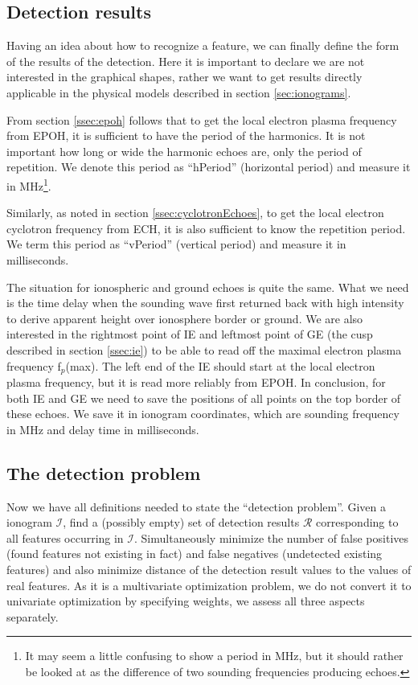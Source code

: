 \subsection{Detection results}
Having an idea about how to recognize a feature, we can finally define the form of the results of the detection. Here it is important to declare we are not interested in the graphical shapes, rather we want to get results directly applicable in the physical models described in section \ref{sec:ionograms}. 

From section \ref{ssec:epoh} follows that to get the local electron plasma frequency from EPOH, it is sufficient to have the period of the harmonics. It is not important how long or wide the harmonic echoes are, only the period of repetition. We  denote this period as ``hPeriod'' (horizontal period) and measure it in MHz\footnote{It may seem a little confusing to show a period in MHz, but it should rather be looked at as the difference of two sounding frequencies producing echoes.}.

Similarly, as noted in section \ref{ssec:cyclotronEchoes}, to get the local electron cyclotron frequency from ECH, it is also sufficient to know the repetition period. We term this period as ``vPeriod'' (vertical period) and measure it in milliseconds. 

The situation for ionospheric and ground echoes is quite the same. What we need is the time delay when the sounding wave first returned back with high intensity to derive apparent height over ionosphere border or ground. We are also interested in the rightmost point of IE and leftmost point of GE (the cusp described in section \ref{ssec:ie}) to be able to read off the maximal electron plasma frequency f$_p$(max). The left end of the IE should start at the local electron plasma frequency, but it is read more reliably from EPOH. In conclusion, for both IE and GE we need to save the positions of all points on the top border of these echoes. We save it in ionogram coordinates, which are sounding frequency in MHz and delay time in milliseconds.

\subsection{The detection problem}
Now we have all definitions needed to state the ``detection problem''. Given a ionogram $\mathcal{I}$, find a (possibly empty) set of detection results $\mathcal{R}$ corresponding to all features occurring in $\mathcal{I}$. Simultaneously minimize the number of false positives (found features not existing in fact) and false negatives (undetected existing features) and also minimize distance of the detection result values to the values of real features. As it is a multivariate optimization problem, we do not convert it to univariate optimization by specifying weights, we assess all three aspects separately.

